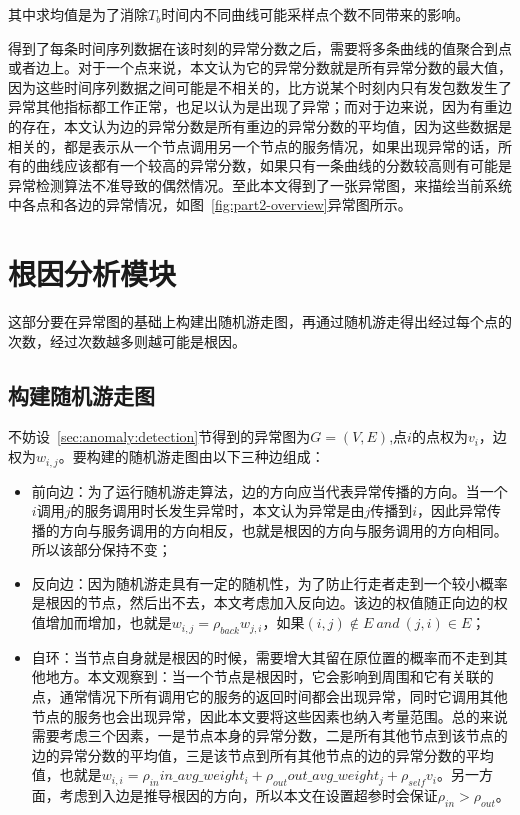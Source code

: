 其中求均值是为了消除$T_b$时间内不同曲线可能采样点个数不同带来的影响。

得到了每条时间序列数据在该时刻的异常分数之后，需要将多条曲线的值聚合到点或者边上。对于一个点来说，本文认为它的异常分数就是所有异常分数的最大值，因为这些时间序列数据之间可能是不相关的，比方说某个时刻内只有发包数发生了异常其他指标都工作正常，也足以认为是出现了异常；而对于边来说，因为有重边的存在，本文认为边的异常分数是所有重边的异常分数的平均值，因为这些数据是相关的，都是表示从一个节点调用另一个节点的服务情况，如果出现异常的话，所有的曲线应该都有一个较高的异常分数，如果只有一条曲线的分数较高则有可能是异常检测算法不准导致的偶然情况。至此本文得到了一张异常图，来描绘当前系统中各点和各边的异常情况，如图~\ref{fig:part2-overview}异常图所示。
\section{根因分析模块}
这部分要在异常图的基础上构建出随机游走图，再通过随机游走得出经过每个点的次数，经过次数越多则越可能是根因。


\subsection{构建随机游走图}
不妨设~\ref{sec:anomaly:detection}节得到的异常图为$G=(V,E)$,点$i$的点权为$v_i$，边权为$w_{i,j}$。要构建的随机游走图由以下三种边组成：
\begin{itemize}
  \item 前向边：为了运行随机游走算法，边的方向应当代表异常传播的方向。当一个$i$调用$j$的服务调用时长发生异常时，本文认为异常是由$j$传播到$i$，因此异常传播的方向与服务调用的方向相反，也就是根因的方向与服务调用的方向相同。所以该部分保持不变；
  \item 反向边：因为随机游走具有一定的随机性，为了防止行走者走到一个较小概率是根因的节点，然后出不去，本文考虑加入反向边。该边的权值随正向边的权值增加而增加，也就是$w_{i,j} = \rho_{back} w_{j,i}$，如果$(i,j) \notin E\ and\  (j,i) \in E$；
  \item 自环：当节点自身就是根因的时候，需要增大其留在原位置的概率而不走到其他地方。本文观察到：当一个节点是根因时，它会影响到周围和它有关联的点，通常情况下所有调用它的服务的返回时间都会出现异常，同时它调用其他节点的服务也会出现异常，因此本文要将这些因素也纳入考量范围。总的来说需要考虑三个因素，一是节点本身的异常分数，二是所有其他节点到该节点的边的异常分数的平均值，三是该节点到所有其他节点的边的异常分数的平均值，也就是$w_{i,i} = \rho_{in} in\_avg\_weight_{i} + \rho_{out} out\_avg\_weight_{j}+ \rho_{self}  v_i$。另一方面，考虑到入边是推导根因的方向，所以本文在设置超参时会保证$\rho_{in}>\rho_{out}$。
\end{itemize}

